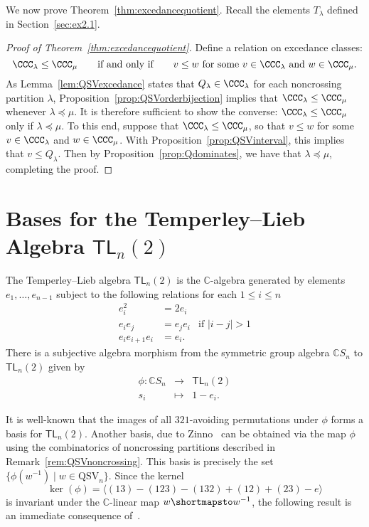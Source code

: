 \documentclass[12pt]{article}
\theoremstyle{definition}
\theoremstyle{remark}
\numberwithin{equation}{section}
\newcommand{\CC}{\mathbb{C}}
\renewcommand{\to}{\longrightarrow}
\renewcommand{\mapsto}{\longmapsto}
\newcommand{\TL}{\mathsf{TL}}
\newcommand{\QSV}{\mathrm{QSV}}
\begin{document}
We now prove Theorem~\ref{thm:excedancequotient}.  Recall the elements $T_{\lambda}$ defined in Section~\ref{sec:ex2.1}.

\begin{proof}[Proof of Theorem~\ref{thm:excedancequotient}]
Define a relation on excedance classes:
\[
\CCC_{\lambda} \le \CCC_{\mu}
\qquad\text{if and only if}\qquad
\text{$v \le w$ for some $v \in \CCC_{\lambda}$ and $w \in \CCC_{\mu}$}.
\]
As Lemma~\ref{lem:QSVexcedance} states that $Q_{\lambda} \in \CCC_{\lambda}$ for each noncrossing partition $\lambda$, Proposition~\ref{prop:QSVorderbijection} implies that $\CCC_{\lambda} \le \CCC_{\mu}$ whenever $\lambda \preceq \mu$.  It is therefore sufficient to show the converse: $\CCC_{\lambda} \le \CCC_{\mu}$ only if $\lambda \preceq \mu$.  To this end, suppose that $\CCC_{\lambda} \le \CCC_{\mu}$, so that $v \le w$ for some $v \in \CCC_{\lambda}$ and $w \in \CCC_{\mu}$.  With Proposition~\ref{prop:QSVinterval}, this implies that $v \le Q_{\lambda}$.  Then by Proposition~\ref{prop:Qdominates}, we have that $\lambda \preceq \mu$, completing the proof.
\end{proof}


\section{Bases for the Temperley--Lieb Algebra $\TL_{n}(2)$}

The Temperley--Lieb algebra $\TL_{n}(2)$ is the $\CC$-algebra generated by elements $e_{1}, \ldots, e_{n-1}$ subject to the following relations for each $1 \le i \le n$
\[
\begin{array}{rlr}
e_{i}^{2} &= 2 e_{i} \\
e_{i}e_{j} &= e_{j}e_{i} & \text{if $|i - j| > 1$} \\
e_{i} e_{i + 1} e_{i} &= e_{i}.
\end{array}
\]
There is a subjective algebra morphism from the symmetric group algebra $\CC S_{n}$ to $\TL_{n}(2)$ given by 
\[
\begin{array}{rcl}
\phi: \CC S_{n} & \to & \TL_{n}(2) \\
s_{i} & \mapsto & 1 - e_{i}.
\end{array}
\]

It is well-known that the images of all $321$-avoiding permutations under $\phi$ forms a basis for $\TL_{n}(2)$.  
Another basis, due to Zinno~\cite{Zinno} can be obtained via the map $\phi$ using the combinatorics of noncrossing partitions described in Remark~\ref{rem:QSVnoncrossing}.  This basis is precisely the set $\{\phi(w^{-1}) \;|\; w \in \QSV_{n}\}$.  Since the kernel
\[
\ker(\phi) = \langle (13) - (123) - (132) + (12) + (23) - e \rangle
\]
is invariant under the $\CC$-linear map $w \shortmapsto w^{-1}$, the following result is an immediate consequence of~\cite[Theorem 2]{Zinno}.
\end{document}
